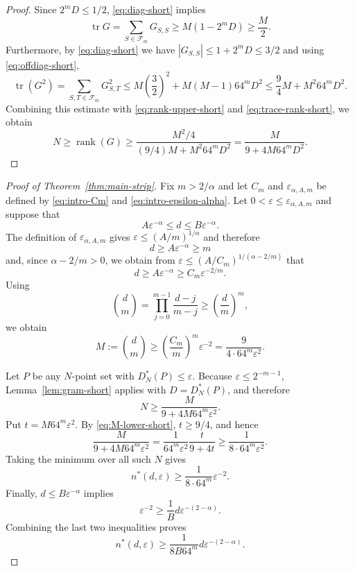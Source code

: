 \documentclass[10pt,a4paper]{amsart}
\newcommand{\1}{\mathbf{1}}
\newcommand{\tr}{\operatorname{tr}}
\newcommand{\rank}{\operatorname{rank}}
\begin{document}
\begin{proof}
Since \(2^mD\le1/2\), \eqref{eq:diag-short} implies
\[
 \tr G = \sum_{S \in \mathcal{F}_m } G_{S,S} \ge M (1 - 2^m D) \ge \frac M2.
\]
Furthermore, by \eqref{eq:diag-short} we have $|G_{S,S}| \le 1 + 2^m D \le 3/2$ and  using \eqref{eq:offdiag-short},
\[
 \tr(G^2)
 =
 \sum_{S,T\in\mathcal F_m}G_{S,T}^2
 \le
 M\left(\frac32\right)^2
 +M(M-1)64^mD^2
 \le
 \frac94M+M^2 64^mD^2.
\]
Combining this estimate with \eqref{eq:rank-upper-short} and
\eqref{eq:trace-rank-short}, we obtain
\[
 N \ge \rank(G)
 \ge
 \frac{M^2/4}{(9/4)M+M^2 64^mD^2}
 =
 \frac{M}{9+4M64^mD^2}.
\]
\end{proof}


\begin{proof}[Proof of Theorem~\ref{thm:main-strip}]
Fix \(m>2/\alpha\) and let \(C_m\) and
\(\varepsilon_{\alpha,A,m}\) be defined by
\eqref{eq:intro-Cm} and \eqref{eq:intro-epsilon-alpha}.  Let
\(0<\varepsilon\le\varepsilon_{\alpha,A,m}\) and suppose that
\[
 A\varepsilon^{-\alpha}\le d\le B\varepsilon^{-\alpha}.
\]
The definition of \(\varepsilon_{\alpha,A,m}\) gives $\varepsilon \le (A/m)^{1/\alpha}$ and therefore
\[
 d\ge A\varepsilon^{-\alpha}\ge m
\]
and, since \(\alpha-2/m>0\), we obtain from $\varepsilon \le (A/C_m)^{1/(\alpha - 2/m)}$ that
\[
 d\ge A\varepsilon^{-\alpha}
 \ge C_m\varepsilon^{-2/m}.
\]
Using
\[
 \binom dm
 =
 \prod_{j=0}^{m-1}\frac{d-j}{m-j}
 \ge\left(\frac dm\right)^m,
\]
we obtain
\begin{equation}\label{eq:M-lower-short}
 M:=\binom dm
 \ge
 \left(\frac{C_m}{m}\right)^m\varepsilon^{-2}
 =
 \frac9{4\cdot64^m\varepsilon^2}.
\end{equation}

Let \(P\) be any \(N\)-point set with \(D_N^\ast(P)\le\varepsilon\).
Because \(\varepsilon\le2^{-m-1}\), Lemma~\ref{lem:gram-short} applies
with \(D=D_N^\ast(P)\), and therefore
\[
 N
 \ge
 \frac{M}{9+4M64^m\varepsilon^2}.
\]
Put \(t=M64^m\varepsilon^2\).  By \eqref{eq:M-lower-short},
\(t\ge9/4\), and hence
\[
 \frac{M}{9+4M64^m\varepsilon^2}
 =
 \frac1{64^m\varepsilon^2}\frac{t}{9+4t}
 \ge
 \frac1{8\cdot64^m\varepsilon^2}.
\]
Taking the minimum over all such \(N\) gives
\[
 n^\ast(d,\varepsilon)
 \ge
 \frac1{8\cdot64^m}\varepsilon^{-2}.
\]
Finally, \(d\le B\varepsilon^{-\alpha}\) implies
\[
 \varepsilon^{-2}
 \ge
 \frac1B d\varepsilon^{-(2-\alpha)}.
\]
Combining the last two inequalities proves
\[
 n^\ast(d,\varepsilon)
 \ge
 \frac1{8B64^m}
 d\varepsilon^{-(2-\alpha)}.
\]
\end{proof}
\end{document}
